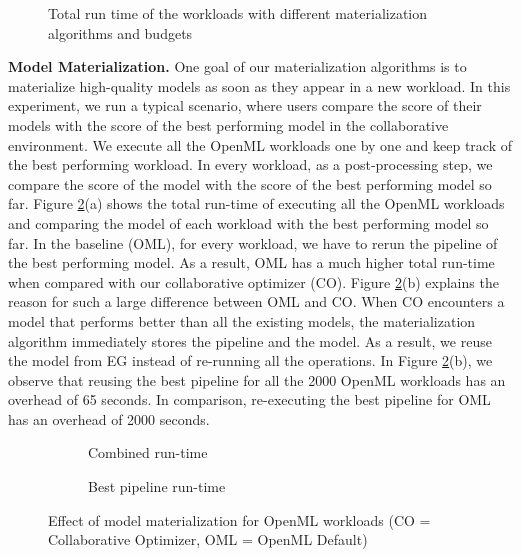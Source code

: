 \begin{figure}
\centering
 \resizebox{0.7\columnwidth}{!}{%
%
}
\caption{Total run time of the workloads with different materialization algorithms and budgets}
\label{run-time-vs-mat}
\end{figure}

\textbf{Model Materialization. }
One goal of our materialization algorithms is to materialize high-quality models as soon as they appear in a new workload.
In this experiment, we run a typical scenario, where users compare the score of their models with the score of the best performing model in the collaborative environment.
We execute all the OpenML workloads one by one and keep track of the best performing workload.
In every workload, as a post-processing step, we compare the score of the model with the score of the best performing model so far.
Figure \ref{exp-model-materialization}(a) shows the total run-time of executing all the OpenML workloads and comparing the model of each workload with the best performing model so far.
In the baseline (OML), for every workload, we have to rerun the pipeline of the best performing model.
As a result, OML has a much higher total run-time when compared with our collaborative optimizer (CO).
Figure \ref{exp-model-materialization}(b) explains the reason for such a large difference between OML and CO.
When CO encounters a model that performs better than all the existing models, the materialization algorithm immediately stores the pipeline and the model.
As a result, we reuse the model from EG instead of re-running all the operations.
In Figure \ref{exp-model-materialization}(b), we observe that reusing the best pipeline for all the 2000 OpenML workloads has an overhead of 65 seconds.
In comparison, re-executing the best pipeline for OML has an overhead of 2000 seconds.

\begin{figure}
\begin{subfigure}[b]{0.5\linewidth}
\centering
 \resizebox{\columnwidth}{!}{%
%
}
\caption{Combined run-time}
\end{subfigure}%
\begin{subfigure}[b]{0.5\linewidth}
\centering
 \resizebox{\columnwidth}{!}{%
%
}
\caption{Best pipeline run-time}
\end{subfigure}
\caption{Effect of model materialization for OpenML workloads (CO = Collaborative Optimizer, OML = OpenML Default)}
\label{exp-model-materialization}
\end{figure}

